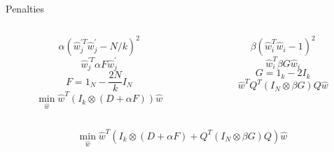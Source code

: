 	\begin{frame}{Penalties}
		\begin{columns}
			\begin{column}{0.5\textwidth}
				$$\alpha\left(\hat{w}_{j}^{\prime T} \hat{w}_{j}^{\prime}-N / k\right)^{2}$$
				\pause
				$$\hat{w}_{j}^{\prime T} \alpha F \hat{w}_{j}^{\prime}$$
				\pause
				$$F=1_{N}-\frac{2 N}{k} I_{N}$$
				\pause
				$$\min _{\hat{w}} \hat{w}^{T}\left(I_{k} \otimes(D+\alpha F)\right) \hat{w}$$
				\pause
			\end{column}
			\begin{column}{0.5\textwidth}  
				$$\beta\left(\hat{w}_{i}^{T} \hat{w}_{i}-1\right)^{2}$$
				\pause
				$$\hat{w}_{i}^{T} \beta G \hat{w}_{i}$$
				\pause
				$$G=1_{k}-2 I_{k}$$
				\pause
				$$\hat{w}^{T} Q^{T}\left(I_{N} \otimes \beta G\right) Q \hat{w}$$
				\pause
			\end{column}
		\end{columns}
		\bigbreak
		$$\min _{\hat{w}} \hat{w}^{T}\left(I_{k} \otimes(D+\alpha F)+Q^{T}\left(I_{N} \otimes \beta G\right) Q\right) \hat{w}$$
	\end{frame}


	
	

